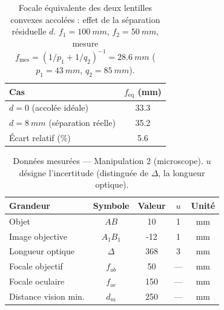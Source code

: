 ﻿\documentclass[a4paper, 11pt]{article}
\begin{document}
\begin{table}[H]
\centering
\caption{Focale équivalente des deux lentilles convexes accolées :
  effet de la séparation résiduelle $d$. $f_1=\SI{100}{mm}$,
  $f_2=\SI{50}{mm}$, mesure
  $f_\mathrm{mes}=(1/p_1+1/q_2)^{-1}=\SI{28.6}{mm}$
  ($p_1=\SI{43}{mm}$, $q_2=\SI{85}{mm}$).}
\label{tab:1c_accolee}
\setlength{\tabcolsep}{8pt}

\begin{tabular}{lc}
\toprule
Cas & $f_\mathrm{eq}$ (\si{mm}) \\
\midrule
$d=0$ (accolée idéale)            & \num{33.3} \\
$d=\SI{8}{mm}$ (séparation réelle) & \num{35.2} \\
\midrule
Écart relatif (\si{\percent})     & \num{5.6} \\
\bottomrule
\end{tabular}
\end{table}


\begin{table}[H]
\centering
\caption{Données mesurées — Manipulation 2 (microscope). $u$ désigne l'incertitude (distinguée de $\Delta$, la longueur optique).}
\label{tab:micro_mesures}
\setlength{\tabcolsep}{8pt}
\renewcommand{\arraystretch}{1.25}
\begin{tabular}{l c S[table-format=-3.0] S[table-format=1.0] c}
\toprule
\textbf{Grandeur} & \textbf{Symbole} & {\textbf{Valeur}} & {\textbf{$u$}} & \textbf{Unité} \\
\midrule
Objet                & $AB$       &  10 & 1 & mm \\
Image objective      & $A_1B_1$   & -12 & 1 & mm \\
Longueur optique     & $\Delta$   & 368 & 3 & mm \\
Focale objectif      & $f_{ob}$   &  50 & {—} & mm \\
Focale oculaire      & $f_{oc}$   & 150 & {—} & mm \\
Distance vision min. & $d_m$      & 250 & {—} & mm \\
\bottomrule
\end{tabular}
\end{table}
\end{document}

